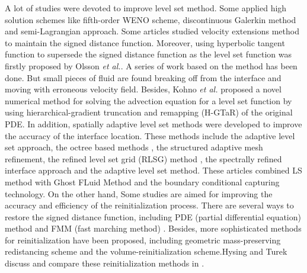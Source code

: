 A lot of studies were devoted to improve level set method. Some applied high solution schemes like fifth-order WENO scheme\cite{nourgaliev2005improving,salih2009some}, discontinuous Galerkin method \cite{reed1973triangular,rasetarinera2001efficient,remacle2007efficient} and semi-Lagrangian approach\cite{enright2005fast,strain1999semi,xiu2001semi}. Some articles studied velocity extensions method to maintain the signed distance function\cite{adalsteinsson1999fast,chopp2009another,ovsyannikov2012new,sabelnikov2014modified}. Moreover, using hyperbolic tangent function to supersede the signed distance function as the level set function was firstly proposed by Olsson \textit{et al.}\cite{OLSSON2005225,OLSSON2007785}. A series of work based on the method has been done\cite{chiodi2017reformulation,chiu2011conservative,sato2012conservative,sheu2009development,sheu2011development,NONOMURA201495,owkes2013discontinuous,xiao2005simple,walker2010conservative,desjardins2008accurate}. But small pieces of fluid are found breaking off from the interface and moving with erroneous velocity field\cite{luo2015mass}. Besides, Kohno \textit{et al.} \cite{KOHNO20131547} proposed a novel numerical method for solving the advection equation for a level set function by using hierarchical-gradient truncation and remapping (H-GTaR) of the original PDE. In addition, spatially adaptive level set methods were developed to improve the accuracy of the interface location. These methods include the adaptive level set approach\cite{sussman1999adaptive}, the octree based methods \cite{losasso2006spatially,fuster2009simulation}, the structured adaptive mesh refinement\cite{nourgaliev2005improving}, the refined level set grid (RLSG) method \cite{herrmann2008balanced}, the spectrally refined interface approach \cite{desjardins2009spectrally} and the adaptive level set method\cite{kim2011accurate}. These articles\cite{nguyen2001boundary,Gihun2005,GIBOU2007536,tanguy2005application} combined LS method with Ghost FLuid Method \cite{fedkiw1999non} and the boundary conditional capturing technology\cite{liu2000boundary}. On the other hand, Some studies are aimed for improving the accuracy and efficiency of the reinitialization process\cite{sussman1998improved,sussman1999efficient,RUSSO200051,HARTMANN20086821}. There are several ways to restore the signed distance function, including PDE (partial differential equation) method \cite{peng1999pde,chang1996level,MCCASLIN2014408} and FMM (fast marching method) \cite{adalsteinsson1995fast,sethian1996fast,sethian2001evolution,salac2011augmented,desjardins2009spectrally,desjardins2008accurate}. Besides, more sophisticated methods for reinitialization have been proposed, including geometric mass-preserving redistancing scheme \cite{ausas2011geometric} and the volume-reinitialization scheme\cite{salih2013mass}.Hysing and Turek discuss and compare these reinitialization methods in \cite{hysing2005eikonal}.

